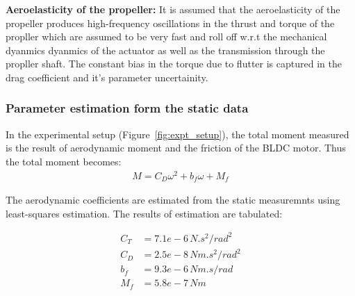 \bigskip

\textbf{Aeroelasticity of the propeller:} It is assumed that the aeroelasticity of the propeller produces high-frequency oscillations in the thrust and torque of the propller which are assumed to be very fast and roll off w.r.t the mechanical dyanmics dyanmics of the actuator as well as the transmission through the propller shaft. The constant  bias in the torque due to flutter is captured in the drag coefficient and it's parameter uncertainity.\\


\subsubsection{Parameter estimation form the static data}

In the experimental setup (Figure~\ref{fig:expt_setup}),  the total moment measured is the result of aerodynamic moment and the friction of the BLDC motor. Thus the total moment becomes:
\begin{align*}
    M = C_D \omega^2 + b_f \omega + M_f
\end{align*}

The aerodynamic coefficients are estimated from the static measuremnts using least-squares estimation. The results of estimation are tabulated:

\begin{align*}
    C_T &= 7.1e-6 \, {N.s^2/rad^2}\\
    C_D &= 2.5e-8 \, {Nm.s^2/rad^2}\\
    b_f &= 9.3e-6 \, {Nm.s/rad}\\
    M_f &= 5.8e-7  \, {Nm}
\end{align*}


